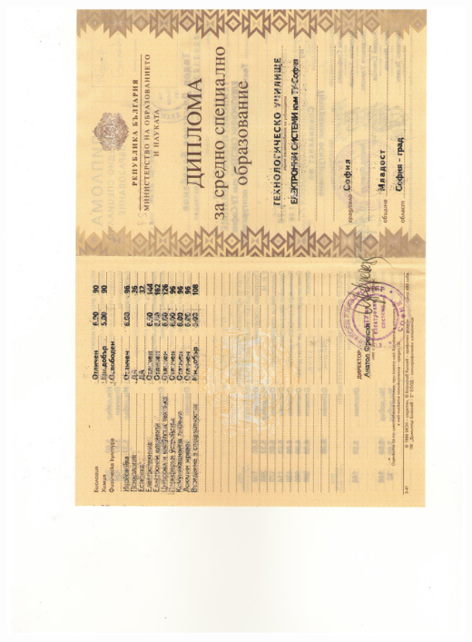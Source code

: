 \documentclass[bulgarian,a4paper]{europasscv}
\begin{document}
\includegraphics[width=\textwidth,height=\textheight,keepaspectratio]{DiplomaTUES1998_2}



\end{document}
